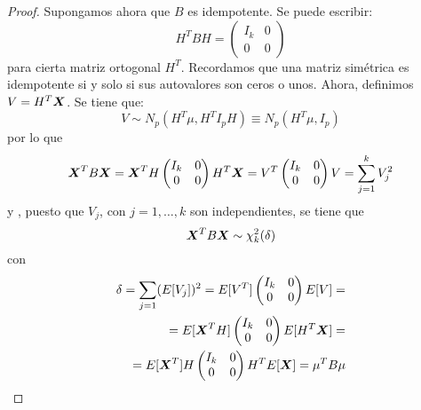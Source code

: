 \begin{proof}
\boxed{\leftarrow} Supongamos ahora que $B$ es idempotente. Se puede escribir:
\[
H^T B H = \begin{pmatrix} I_k & 0 \\ 0 & 0\end{pmatrix}
\]
para cierta matriz ortogonal $H^T$. Recordamos que una matriz simétrica es idempotente si y solo si sus autovalores son ceros o unos. Ahora, definimos  $V = H^T \boldsymbol{X}$. Se tiene que:
\[
V \sim N_p(H^T \mu, H^T I_p H) \equiv N_p(H^T \mu, I_p)
\]
por lo que
\[
\boldsymbol{X}^T B \boldsymbol{X} = \boldsymbol{X}^T H  \begin{pmatrix} I_k & 0 \\ 0 & 0\end{pmatrix} H^T \boldsymbol{X} = V^T  \begin{pmatrix} I_k & 0 \\ 0 & 0\end{pmatrix} V = \sum_{j = 1}^k V_j^2
\]
    y , puesto que $V_j$, con $j = 1,\dots,k$ son independientes, se tiene que
    \[
    \boldsymbol{X}^T B \boldsymbol{X} \sim \chi_k^2(\delta)
    \]
    con
    \begin{align}
      \delta = \sum_{j = 1} (E[V_j])^2 = E[V^T] \begin{pmatrix} I_k & 0 \\ 0 & 0\end{pmatrix} E[V] = \\
  = E[\boldsymbol{X}^T H]\begin{pmatrix} I_k & 0 \\ 0 & 0\end{pmatrix} E[H^T \boldsymbol{X}] = \\
          = E[\boldsymbol{X}^T] H \begin{pmatrix} I_k & 0 \\ 0 & 0\end{pmatrix} H^T E[\boldsymbol{X}] = \mu^T B \mu
     \end{align}
    

\end{proof}


